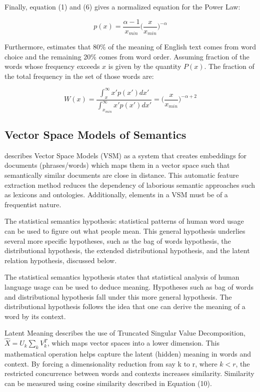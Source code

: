 \documentclass[12pt]{article}
\begin{document}
Finally, equation (1) and (6) gives a normalized equation for the Power Law: 

\begin{equation}
    p(x) = \frac{\alpha - 1}{x_{min}}\bigg(\frac{x}{x_{min}}\bigg)^{-\alpha}
\end{equation}

Furthermore, \cite{LANDAUER200243} estimates that 80\% of the meaning of English text comes from word choice and the remaining 20\% comes from word order. Assuming fraction of the words whose frequency exceeds $x$ is given by the quantity $P(x)$. The fraction of the total frequency in the set of those words are: 

\begin{equation}
    W(x) = \frac{\int_{x}^{\infty} x'p(x') dx'}{\int_{x_{min}}^{\infty} x'p(x') dx'} = \bigg(\frac{x}{x_{min}}\bigg)^{-\alpha+2}
\end{equation}

\begin{center}
\subsection{Vector Space Models of Semantics}
\end{center}

\cite{Turney:2010:FMV:1861751.1861756} describes Vector Space Models (VSM) as a system that creates embeddings for documents (phrases/words) which maps them in a vector space such that semantically similar documents are close in distance. This automatic feature extraction method reduces the dependency of laborious semantic approaches such as lexicons and ontologies. Additionally, elements in a VSM must be of a frequentist nature.

The statistical semantics hypothesis: statistical patterns of human word usage can be used to figure out what people mean. This general hypothesis underlies several more specific hypotheses, such as the bag of words hypothesis, the distributional hypothesis, the extended distributional hypothesis, and the latent relation hypothesis, discussed below.

The statistical semantics hypothesis states that statistical analysis of human language usage can be used to deduce meaning. Hypotheses such as bag of words and distributional hypothesis fall under this more general hypothesis. The distributional hypothesis follows the idea that one can derive the meaning of a word by its context. 

Latent Meaning describes the use of Truncated Singular Value Decomposition, $\hat{X} = U_k \sum_k V_k^T$, which maps vector spaces into a lower dimension. This mathematical operation helps capture the latent (hidden) meaning in words and context. By forcing a dimensionality reduction from say k to r, where $k < r$, the restricted concurrence between words and contexts increases similarity. Similarity can be measured using cosine similarity described in Equation (10).
\end{document}
